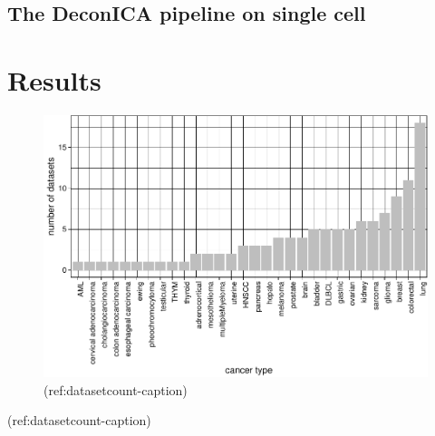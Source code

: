 \documentclass[12pt,]{book}
\theoremstyle{definition}
\theoremstyle{definition}
\theoremstyle{definition}
\theoremstyle{remark}
\begin{document}
\hypertarget{the-deconica-pipeline-on-single-cell}{%
\subsection{The DeconICA pipeline on single
cell}\label{the-deconica-pipeline-on-single-cell}}

\hypertarget{results-1}{%
\section{Results}\label{results-1}}

\begin{figure}

{\centering \includegraphics[width=0.8\linewidth]{UCzPhDThesis_files/figure-latex/datasetcount-1} 

}

\caption[Count of the dasets analyzed with DeconICA]{(ref:datasetcount-caption)}\label{fig:datasetcount}
\end{figure}

(ref:datasetcount-caption)
\end{document}
